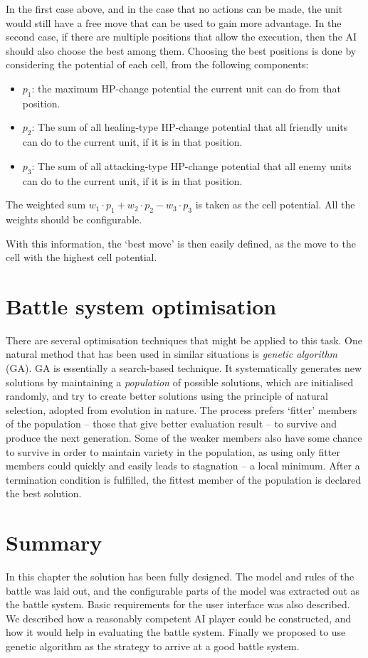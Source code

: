 In the first case above, and in the case that no actions can be made, the unit would still have a free move that can be used to gain more advantage. In the second case, if there are multiple positions that allow the execution, then the AI should also choose the best among them. Choosing the best positions is done by considering the potential of each cell, from the following components:
\begin{itemize}
	\item $p_1$: the maximum HP-change potential the current unit can do from that position.
	\item $p_2$: The sum of all healing-type HP-change potential that all friendly units can do to the current unit, if it is in that position.
	\item $p_3$: The sum of all attacking-type HP-change potential that all enemy units can do to the current unit, if it is in that position.
\end{itemize}
The weighted sum $w_1 \cdot p_1 + w_2 \cdot p_2 - w_3 \cdot p_3$ is taken as the cell potential. All the weights should be configurable.

With this information, the `best move' is then easily defined, as the move to the cell with the highest cell potential.

\section{Battle system optimisation}

There are several optimisation techniques that might be applied to this task. One natural method that has been used in similar situations is \textit{genetic algorithm} (GA). GA is essentially a search-based technique. It systematically generates new solutions by maintaining a \textit{population} of possible solutions, which are initialised randomly, and try to create better solutions using the principle of natural selection, adopted from evolution in nature. The process prefers `fitter' members of the population -- those that give better evaluation result -- to survive and produce the next generation. Some of the weaker members also have some chance to survive in order to maintain variety in the population, as using only fitter members could quickly and easily leads to stagnation -- a local minimum. After a termination condition is fulfilled, the fittest member of the population is declared the best solution.

\section{Summary}

In this chapter the solution has been fully designed. The model and rules of the battle was laid out, and the configurable parts of the model was extracted out as the battle system. Basic requirements for the user interface was also described. We described how a reasonably competent AI player could be constructed, and how it would help in evaluating the battle system. Finally we proposed to use genetic algorithm as the strategy to arrive at a good battle system.